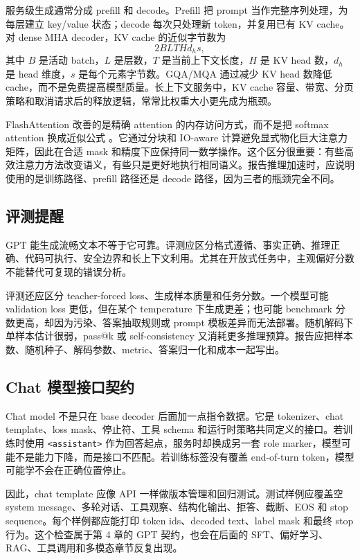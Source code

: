\documentclass[UTF8,zihao=-4,openany]{ctexbook}
\begin{document}
服务级生成通常分成 prefill 和 decode。Prefill 把 prompt 当作完整序列处理，为每层建立 key/value 状态；decode 每次只处理新 token，并复用已有 KV cache。对 dense MHA decoder，KV cache 的近似字节数为
\[
  2BLTHd_hs ,
\]
其中 $B$ 是活动 batch，$L$ 是层数，$T$ 是当前上下文长度，$H$ 是 KV head 数，$d_h$ 是 head 维度，$s$ 是每个元素字节数。GQA/MQA 通过减少 KV head 数降低 cache，而不是免费提高模型质量。长上下文服务中，KV cache 容量、带宽、分页策略和取消请求后的释放逻辑，常常比权重大小更先成为瓶颈。

FlashAttention 改善的是精确 attention 的内存访问方式，而不是把 softmax attention 换成近似公式 \cite{dao2022flashattention}。它通过分块和 IO-aware 计算避免显式物化巨大注意力矩阵，因此在合适 mask 和精度下应保持同一数学操作。这个区分很重要：有些高效注意力方法改变语义，有些只是更好地执行相同语义。报告推理加速时，应说明使用的是训练路径、prefill 路径还是 decode 路径，因为三者的瓶颈完全不同。

\subsection{评测提醒}
GPT 能生成流畅文本不等于它可靠。评测应区分格式遵循、事实正确、推理正确、代码可执行、安全边界和长上下文利用。尤其在开放式任务中，主观偏好分数不能替代可复现的错误分析。

评测还应区分 teacher-forced loss、生成样本质量和任务分数。一个模型可能 validation loss 更低，但在某个 temperature 下生成更差；也可能 benchmark 分数更高，却因为污染、答案抽取规则或 prompt 模板差异而无法部署。随机解码下单样本估计很弱，pass@k 或 self-consistency 又消耗更多推理预算。报告应把样本数、随机种子、解码参数、metric、答案归一化和成本一起写出。

\subsection{Chat 模型接口契约}
Chat model 不是只在 base decoder 后面加一点指令数据。它是 tokenizer、chat template、loss mask、停止符、工具 schema 和运行时策略共同定义的接口。若训练时使用 \texttt{<assistant>} 作为回答起点，服务时却换成另一套 role marker，模型可能不是能力下降，而是接口不匹配。若训练标签没有覆盖 end-of-turn token，模型可能学不会在正确位置停止。

因此，chat template 应像 API 一样做版本管理和回归测试。测试样例应覆盖空 system message、多轮对话、工具观察、结构化输出、拒答、截断、EOS 和 stop sequence。每个样例都应能打印 token ids、decoded text、label mask 和最终 stop 行为。这个检查属于第 4 章的 GPT 契约，也会在后面的 SFT、偏好学习、RAG、工具调用和多模态章节反复出现。
\end{document}
